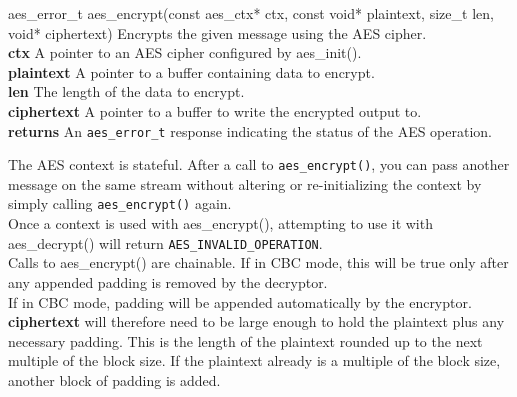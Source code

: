 \documentclass[titlepage]{article}
\begin{document}
			\vspace{1mm}
				\begin{functionspec}[]{aes\_error\_t aes\_encrypt(const aes\_ctx* ctx, const void* plaintext, size\_t len,\\\tabto{40mm}void* ciphertext)}
					Encrypts the given message using the AES cipher.\\
					\textbf{ctx} A pointer to an AES cipher configured by aes\_init().\\
					\textbf{plaintext} A pointer to a buffer containing data to encrypt.\\
					\textbf{len} The length of the data to encrypt.\\
					\textbf{ciphertext} A pointer to a buffer to write the encrypted output to.\\
					\textbf{returns} An \texttt{aes\_error\_t} response indicating the status of the AES operation.
					\begin{notespec}
						The AES context is stateful. After a call to \texttt{aes\_encrypt()}, you can pass another message on the same stream without altering or re-initializing the context by simply calling \texttt{aes\_encrypt()} again.\\
						Once a context is used with aes\_encrypt(), attempting to use it with aes\_decrypt() will return \texttt{AES\_INVALID\_OPERATION}.\\
						Calls to aes\_encrypt() are chainable. If in CBC mode, this will be true only after any appended padding is removed by the decryptor.\\
						If in CBC mode, padding will be appended automatically by the encryptor. \textbf{ciphertext} will therefore need to be large enough to hold the plaintext plus any necessary padding. This is the length of the plaintext rounded up to the next multiple of the block size. If the plaintext already is a multiple of the block size, another block of padding is added.
					\end{notespec}
				\end{functionspec}
		\vspace{1mm}
\end{document}

